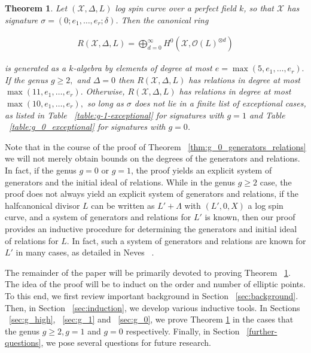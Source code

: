 \documentclass{amsart}
\theoremstyle{plain}
\newtheorem{thm}{Theorem}[section]
\theoremstyle{definition}
\theoremstyle{remark}
\numberwithin{equation}{section}
\newcommand \sx{\mathscr X}
\newcommand\sco{{\mathscr O}}
\newcommand \halfcan{L}
\begin{document}
\begin{thm}
\label{thm:general_generators_relations}
Let $(\sx, \Delta, \halfcan)$ log spin curve over a perfect field $k$, so
that $\sx$ has signature $\sigma = (0; e_1, \ldots, e_r; \delta)$. Then the
canonical ring

\begin{align*}
	R(\sx, \Delta, \halfcan) = \bigoplus_{d = 0}^\infty H^0(\sx, \sco(L)^{\otimes d})
\end{align*}

\noindent
is generated as a $k$-algebra by elements of degree at most $e =
\max(5, e_1, \ldots, e_r).$ If the genus $g \geq 2,$ and $\Delta = 0$ then 
$R(\sx,\Delta, \halfcan)$ has relations in degree at most $\max(11, e_1,
\ldots, e_r).$ Otherwise, $R(\sx, \Delta, \halfcan)$ has relations in degree at most
$\max(10, e_1, \ldots, e_r),$ so long as $\sigma$ does not lie in a finite list of
exceptional cases, as listed in Table ~\ref{table:g-1-exceptional}
for signatures with $g = 1$ and Table ~\ref{table:g_0_exceptional}
for signatures with $g = 0$.
\end{thm}
Note that in the course of the proof of Theorem ~\ref{thm:g_0_generators_relations} we will not merely obtain bounds on the degrees of the generators and relations. In fact, if the genus $g = 0$ or $g = 1$, the proof yields an explicit system of generators and the initial ideal of relations. While in the genus $g \geq 2$ case, the proof does not always yield an explicit system of generators and relations, if the halfcanonical divisor $\halfcan$ can be written as $\halfcan' + \Lambda$ with $(\halfcan',0,X)$ a log spin curve, and a system of generators and relations for $\halfcan'$ is known, then our proof provides an inductive procedure for determining the generators and initial ideal of relations for $\halfcan$. In fact, such a system of generators and relations are known for $\halfcan'$ in many cases, as detailed in Neves ~\cite[Section III.4]{neves:halfcan}.



The remainder of the paper will be primarily devoted to proving Theorem ~\ref{thm:general_generators_relations}. The idea of the proof will be to induct on the order and number of elliptic points. To this end, we first review important background in Section ~\ref{sec:background}. Then, in Section ~\ref{sec:induction}, we develop various inductive tools. In Sections ~\ref{sec:g_high}, ~\ref{sec:g_1} and ~\ref{sec:g_0}, we prove Theorem \ref{thm:general_generators_relations} in the cases that the genus $g \geq 2, g = 1$ and $g = 0$ respectively. Finally, in Section ~\ref{further-questions}, we pose several questions for future research.
\end{document}
